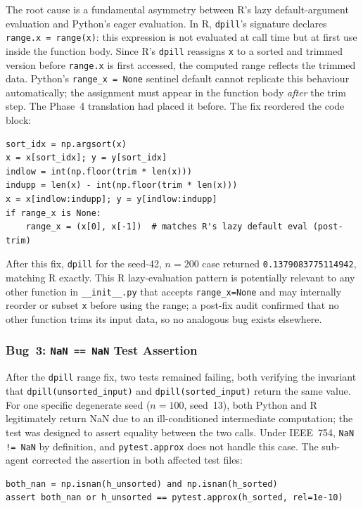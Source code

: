 \documentclass[12pt,a4paper]{article}
\begin{document}
The root cause is a fundamental asymmetry between R's lazy default-argument evaluation and Python's eager evaluation. In R, \texttt{dpill}'s signature declares \texttt{range.x~=~range(x)}: this expression is not evaluated at call time but at first use inside the function body. Since R's \texttt{dpill} reassigns \texttt{x} to a sorted and trimmed version before \texttt{range.x} is first accessed, the computed range reflects the trimmed data. Python's \texttt{range\_x~=~None} sentinel default cannot replicate this behaviour automatically; the assignment must appear in the function body \emph{after} the trim step. The Phase~4 translation had placed it before. The fix reordered the code block:

\begin{lstlisting}[style=python]
sort_idx = np.argsort(x)
x = x[sort_idx]; y = y[sort_idx]
indlow = int(np.floor(trim * len(x)))
indupp = len(x) - int(np.floor(trim * len(x)))
x = x[indlow:indupp]; y = y[indlow:indupp]
if range_x is None:
    range_x = (x[0], x[-1])  # matches R's lazy default eval (post-trim)
\end{lstlisting}

After this fix, \texttt{dpill} for the seed-42, $n=200$ case returned \texttt{0.1379083775114942}, matching R exactly. This R lazy-evaluation pattern is potentially relevant to any other function in \texttt{\_\_init\_\_.py} that accepts \texttt{range\_x=None} and may internally reorder or subset \texttt{x} before using the range; a post-fix audit confirmed that no other function trims its input data, so no analogous bug exists elsewhere.

\subsubsection{Bug~3: \texttt{NaN == NaN} Test Assertion}

After the \texttt{dpill} range fix, two tests remained failing, both verifying the invariant that \texttt{dpill(unsorted\_input)} and \texttt{dpill(sorted\_input)} return the same value. For one specific degenerate seed ($n=100$, seed~13), both Python and R legitimately return NaN due to an ill-conditioned intermediate computation; the test was designed to assert equality between the two calls. Under IEEE~754, \texttt{NaN != NaN} by definition, and \texttt{pytest.approx} does not handle this case. The sub-agent corrected the assertion in both affected test files:

\begin{lstlisting}[style=python]
both_nan = np.isnan(h_unsorted) and np.isnan(h_sorted)
assert both_nan or h_unsorted == pytest.approx(h_sorted, rel=1e-10)
\end{lstlisting}
\end{document}
